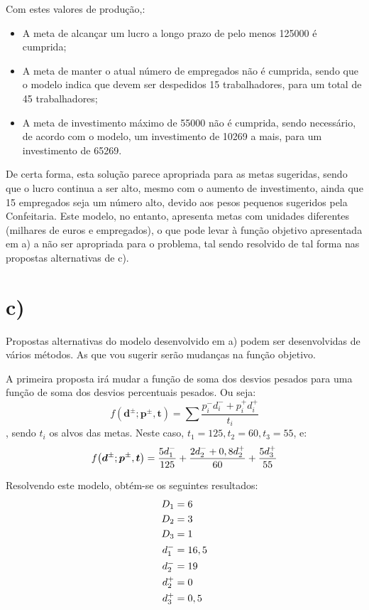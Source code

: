Com estes valores de produção,:
\begin{itemize}
  \item A meta de alcançar um lucro a longo prazo de pelo menos \qty{125000}{\geneuro} é cumprida;
  \item A meta de manter o atual número de empregados não é cumprida, sendo que o modelo indica que devem ser despedidos 15 trabalhadores, para um total de 45 trabalhadores;
  \item A meta de investimento máximo de \qty{55000}{\geneuro} não é cumprida, sendo necessário, de acordo com o modelo, um investimento de \qty{10269}{\geneuro} a mais, para um investimento de \qty{65269}{\geneuro}.
\end{itemize}

De certa forma, esta solução parece apropriada para as metas sugeridas, sendo que o lucro continua a ser alto, mesmo com o aumento de investimento, ainda que 15 empregados seja um número alto, devido aos pesos pequenos sugeridos pela Confeitaria. Este modelo, no entanto, apresenta metas com unidades diferentes (milhares de euros e empregados), o que pode levar à função objetivo apresentada em a) a não ser apropriada para o problema, tal sendo resolvido de tal forma nas propostas alternativas de c).

\section{c)}

Propostas alternativas do modelo desenvolvido em a) podem ser desenvolvidas de vários métodos. As que vou sugerir serão mudanças na função objetivo. 

A primeira proposta irá mudar a função de soma dos desvios pesados para uma função de soma dos desvios percentuais pesados. Ou seja:
$$
f\left(\mathbold{d^\pm}; \mathbold{p^\pm}, \mathbold{t}\right) = \sum{\frac{p_i^-d_i^- + p_i^+d_i^+}{t_i}}
$$
, sendo $t_i$ os alvos das metas. Neste caso, $t_1 = 125, t_2 = 60, t_3 = 55$, e: 
$$
f\left(\mathbold{d^\pm}; \mathbold{p^\pm}, \mathbold{t}\right) = \frac{5\d1-}{125} + \frac{2\d2- + 0,8\d2+}{60} + \frac{5\d3+}{55}
$$

Resolvendo este modelo, obtém-se os seguintes resultados:
\begin{align*}
  D_1  &=       6     \\
  D_2  &=       3     \\
  D_3  &=       1     \\
  d_{1}^{-} &=       16,5  \\
  d_{2}^{-} &=       19    \\
  d_{2}^{+} &=       0     \\
  d_{3}^{+} &=       0,5   \\
\end{align*}

